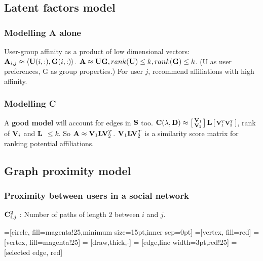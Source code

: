 \documentclass{beamer}
\begin{document}
\subsection{Latent factors model}
\begin{frame}
\frametitle{Modelling A alone}
\begin{itemize}
\pitem User-group affinity as a product of low dimensional vectors: $\mathbf{A}_{i, j} \approx \langle\mathbf{U}(i, :), \mathbf{G}(i, :)\rangle$.
\pitem $\mathbf{A} \approx \mathbf{U} \mathbf{G}, rank(\mathbf{U}) \leq k, rank(\mathbf{G}) \leq k$. (U as user preferences, G as group properties.)
\pitem For user $j$, recommend affiliations with high affinity.
\end{itemize}
\end{frame}

\begin{frame}
\frametitle{Modelling C}
\begin{itemize}
\pitem A \textbf{good model} will account for edges in $\mathbf{S}$ too. $\mathbf{C}(\lambda, \mathbf{D}) \approx \left[ \begin{smallmatrix}\mathbf{V}_1\\ \mathbf{V}_2 \end{smallmatrix} \right]\mathbf{L} \left[ \begin{smallmatrix}\mathbf{V}_1^{T} \mathbf{V}_2^{T} \end{smallmatrix} \right]$, rank of $\mathbf{V}_i$ and $\mathbf{L}$ $\leq k$.
\pitem So $\mathbf{A} \approx \mathbf{V}_1 \mathbf{L} \mathbf{V}_2^T$.
\pitem $\mathbf{V}_1 \mathbf{L} \mathbf{V}_2^T$ is a similarity score matrix for ranking potential affiliations.
\end{itemize}
\end{frame}


\subsection{Graph proximity model}
\begin{frame}
\frametitle{Proximity between users in a social network}
$\mathbf{C}^{2}_{i,j}$ : Number of paths of length 2 between $i$ and $j$.

=[circle, fill=magenta!25,minimum size=15pt,inner sep=0pt]
=[vertex, fill=red]
=[vertex, fill=magenta!25]
 = [draw,thick,-]
 = [edge,line width=3pt,red!25]
 = [selected edge, red]

\begin{center}
\end{center}
\end{frame}
\end{document}
